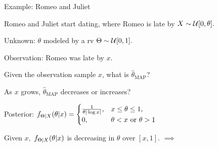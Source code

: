 \begin{frame}{Example: Romeo and Juliet}

\hfill {}
  
\plitemsep 0.05in
\bci
\item<1-> Romeo and Juliet start dating, where 
Romeo is late by $X \sim \mathcal U[0,\theta].$
\item<1-> Unknown: $\theta$ modeled by a rv $\Theta \sim \mathcal U[0,1].$
\item<1-> Observation: Romeo was late by $x.$
\item<1-> \question Given the observation sample $x$, what is $\hat{\theta}_\text{MAP}$? 
\item<2->  As $x$ grows, $\hat{\theta}_\text{MAP}$
  decreases or increases?  

  
\item<4-> Posterior:    $
    \displaystyle
     f_{\Theta|X}(\theta|x) = 
      \begin{cases}
        \frac{1}{\theta |\log x|},&  x \le \theta \le 1, \cr
        0, & \theta < x \text{ or } \theta >1
      \end{cases}
      $

    \item<5-> Given $x,$ $f_{\Theta|X}(\theta|x)$ is decreasing in $\theta$ over $[x,1].$
$\implies $ 

\eci

\end{frame}




